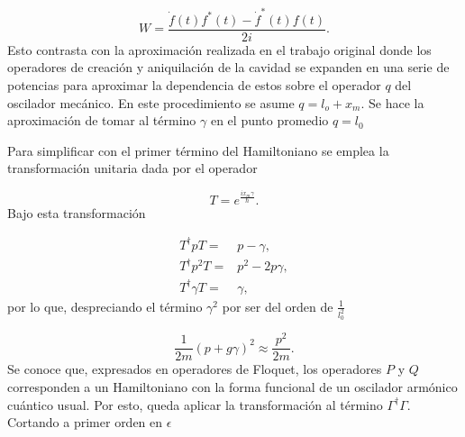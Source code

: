 \documentclass[10pt,a4paper]{report}
\begin{document}
\begin{equation}
W= \frac{\dot{f}(t)f^*(t)-\dot{f}^*(t)f(t)}{2i}.
\end{equation}
Esto contrasta con la aproximación realizada en el trabajo original
donde los operadores de creación y aniquilación de la cavidad se
expanden en una serie de potencias para aproximar la dependencia de
estos sobre el operador $q$ del oscilador mecánico. En este
procedimiento se asume $q = l_o + x_m$.  Se hace la aproximación de tomar al término $\gamma$ en el punto promedio  $q=l_0$



Para simplificar con el primer término del Hamiltoniano se emplea la transformación unitaria dada por el operador

\begin{equation}
T = e^\frac{i x_m \gamma}{\hbar}.
\end{equation} Bajo esta transformación 

\begin{align*}
T^\dagger p T =& p - \gamma, \\
T^\dagger p^2 T =& p^2 -2p\gamma, \\
T^\dagger \gamma T =& \gamma,
\end{align*} por lo que, despreciando el término $\gamma^2$ por ser del orden de $\frac{1}{l_0^2}$

\begin{equation}
\frac{1}{2m}(p + g \gamma)^2 \approx \frac{p^2}{2m}.
\end{equation} Se conoce que, expresados en operadores de Floquet, los operadores $P$ y $Q$ corresponden a un Hamiltoniano con la forma funcional de un oscilador armónico cuántico usual. Por esto, queda aplicar la transformación al término $\Gamma^\dagger \Gamma$. Cortando a primer orden en $\epsilon$
\end{document}
